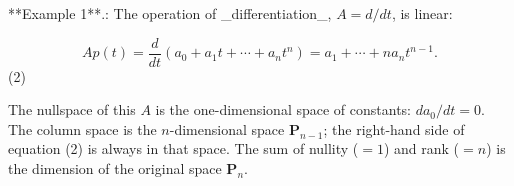 **Example 1**.: The operation of _differentiation_, \(A=d/dt\), is linear:

\[Ap(t)=\frac{d}{dt}(a_{0}+a_{1}t+\cdots+a_{n}t^{n})=a_{1}+\cdots+na_{n}t^{n-1}.\] (2)

The nullspace of this \(A\) is the one-dimensional space of constants: \(da_{0}/dt=0\). The column space is the \(n\)-dimensional space \(\mathbf{P}_{n-1}\); the right-hand side of equation (2) is always in that space. The sum of nullity (\(=1\)) and rank (\(=n\)) is the dimension of the original space \(\mathbf{P}_{n}\).

 